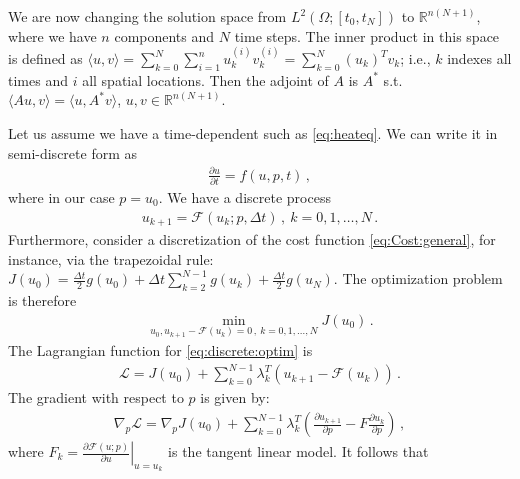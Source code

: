 \documentclass[10pt]{article}
\newcommand{\dt}{\Delta t}
\newcommand{\CostFcn}{J}
\newcommand{\param}{p}
\newcommand{\ModelN}{{\mathcal{F}}}
\newcommand{\ModelTLM}{F}
\newcommand{\Lagrangian}{{\mathcal{L}}}
\begin{document}
We are now changing the solution space from $L^2(\Omega;[t_0,t_N])$ to
$\mathbb{R}^{n(N+1)}$, where we have $n$ components and $N$ time
steps. The inner product in this space is defined as $\langle u , v
\rangle = \sum_{k=0}^N \sum_{i=1}^{n} u_k^{(i)} v_k^{(i)} =
\sum_{k=0}^N  (u_k)^T v_k$; i.e., $k$ indexes all times and $i$ all
spatial locations. Then the adjoint of $A$ is $A^*$ s.t. $\langle A u , v
\rangle = \langle u , A^* v \rangle $, $u,v \in \mathbb{R}^{n(N+1)}$.

Let us assume we have a time-dependent such as \eqref{eq:heateq}. We
can write it in semi-discrete form as
%
\begin{align}
  \label{eq:semi:discrete:form}
\frac{\partial u}{\partial t} = f(u,p,t)\,, 
\end{align}
%
where in our case $\param=u_0$. We have a discrete process
%
\begin{align}
   \label{eq:discrete:form}
u_{k+1} = \ModelN(u_{k};\param,\dt)\,,~ k=0,1,\dots, N\,.
\end{align}
%
Furthermore, consider a discretization of the cost function
\eqref{eq:Cost:general}, for instance, via the trapezoidal rule:
$\CostFcn(u_0) = \frac{\dt}{2} g(u_0) + \dt\sum_{k=2}^{N-1}  g(u_k) +
\frac{\dt}{2} g(u_N)$. The optimization problem is therefore
%
\begin{align}
  \label{eq:discrete:optim}
\min_{u_0,u_{k+1} - \ModelN(u_{k})=0\,,~ k=0,1,\dots, N} \CostFcn(u_0)\,.
\end{align}
%
The Lagrangian function for \eqref{eq:discrete:optim} is
%
\begin{align}
  \nonumber
\Lagrangian = \CostFcn(u_0) + \sum_{k=0}^{N-1} \lambda_k^T
\left(u_{k+1} - \ModelN(u_{k})\right)\,. 
\end{align}
%
The gradient with respect to $\param$ is given by:
%
\begin{align}
  \nonumber
\nabla_\param\Lagrangian =\nabla_\param \CostFcn(u_0) + \sum_{k=0}^{N-1}
\lambda_k^T \left(\frac{\partial u_{k+1}}{\partial \param} - \ModelTLM
\frac{\partial u_{k}}{\partial \param}\right)\,,
\end{align}
%
where $\ModelTLM_k = \left. \frac{\partial \ModelN(u;\param)}{\partial
  u}\right|_{u=u_k}$ is the tangent linear model. It follows that
%
\end{document}
